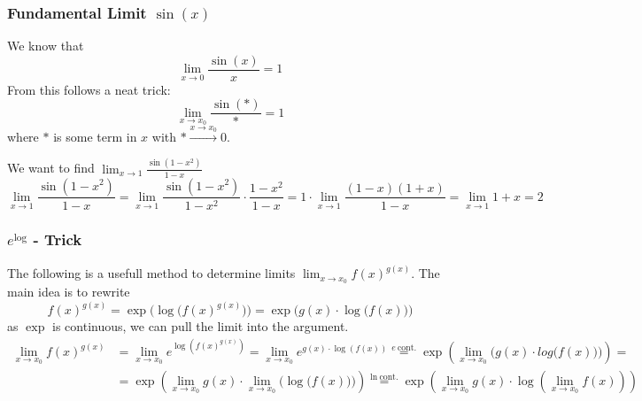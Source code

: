 \subsubsection{Fundamental Limit \(\sin(x)\)}
We know that
\[\lim_{x \to 0} \frac{\sin(x)}{x} = 1\]
From this follows a neat trick:
\[\lim_{x \to x_0} \frac{\sin(\ast)}{\ast} = 1\]
where \(\ast\) is some term in \(x\) with \(\ast \xrightarrow{x \to x_0} 0\).
\begin{example}
   We want to find \(\lim_{x \to 1} \frac{\sin(1-x^2)}{1-x}\)
   \[\lim_{x \to 1} \frac{\sin(1-x^2)}{1-x} = \lim_{x \to 1}\frac{\sin(1-x^2)}{1-x^2} \cdot \frac{1-x^2}{1-x} = 1 \cdot \lim_{x \to 1} \frac{(1-x)(1+x)}{1-x} = \lim_{x \to 1} 1 + x = 2\]
\end{example}

\subsubsection{\(e^{\log}\) - Trick}
The following is a usefull method to determine limits \(\lim_{x \to x_0} f(x)^{g(x)}\).
The main idea is to rewrite
\[f(x)^{g(x)} = \exp\Big(\log\big(f(x)^{g(x)}\big)\Big) = \exp\Big(g(x) \cdot \log\big(f(x)\big)\Big)\]
as \(\exp\) is continuous, we can pull the limit into the argument.
\begin{equation*}
   \begin{split}
      \lim_{x \to x_0} f(x)^{g(x)} &= \lim_{x \to x_0} e^{\log(f(x)^{g(x)})} = \lim_{x \to x_0} e^{g(x) \cdot \log(f(x))} \overset{e~\text{cont.}}{=} \exp\left(\lim_{x \to x_0} \Big(g(x) \cdot log\big(f(x)\big)\Big)\right) = \\
                                   & = \exp\left(\lim_{x \to x_0}g(x) \cdot \lim_{x \to x_0}\Big(\log\big(f(x)\big)\Big)\right) \overset{\ln~\text{cont.}}{=} \exp\left(\lim_{x \to x_0}g(x) \cdot \log\left(\lim_{x \to x_0}f(x)\right)\right)
   \end{split}
\end{equation*}


